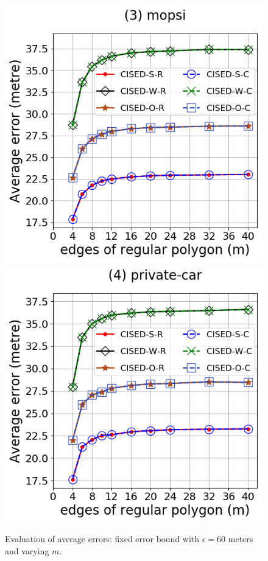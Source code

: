 \begin{figure}[tb!]
\includegraphics[scale = 0.30]{Figures/Exp-M-e-60-error-mopsi.png}
\includegraphics[scale = 0.30]{Figures/Exp-M-e-60-error-private.png}
\vspace{-1ex}
\caption{\small Evaluation of average errors: fixed error bound with $\epsilon = 60$ meters and varying $m$.}
\label{fig:m-error-e60}
\vspace{-1ex}
\end{figure}


